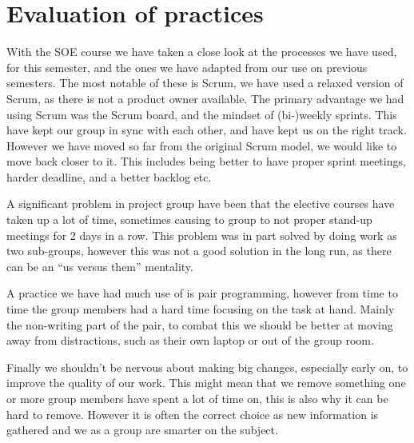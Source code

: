 \chapter{Evaluation of practices}
With the SOE course we have taken a close look at the processes we have used, for this semester, and the ones we have adapted from our use on previous semesters.
The most notable of these is Scrum, we have used a relaxed version of Scrum, as there is not a product owner available. 
The primary advantage we had using Scrum was the Scrum board, and the mindset of (bi-)weekly sprints.
This have kept our group in sync with each other, and have kept us on the right track. 
However we have moved so far from the original Scrum model, we would like to move back closer to it.
This includes being better to have proper sprint meetings, harder deadline, and a better backlog etc. 

A significant problem in project group have been that the elective courses have taken up a lot of time, sometimes causing to group to not proper stand-up meetings for 2 days in a row. 
This problem was in part solved by doing work as two sub-groups, however this was not a good solution in the long run, as there can be an ``us versus them'' mentality. 

A practice we have had much use of is pair programming, however from time to time the group members had a hard time focusing on the task at hand. 
Mainly the non-writing part of the pair, to combat this we should be better at moving away from distractions, such as their own laptop or out of the group room. 

Finally we shouldn't be nervous about making big changes, especially early on, to improve the quality of our work. 
This might mean that we remove something one or more group members have spent a lot of time on, this is also why it can be hard to remove. 
However it is often the correct choice as new information is gathered and we as a group are smarter on the subject.

